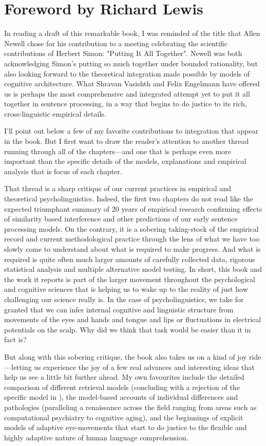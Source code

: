 \chapter*{Foreword by Richard Lewis}

In reading a draft of this remarkable book, I was reminded of the title
that Allen Newell chose for his contribution to a meeting celebrating
the scientific contributions of Herbert Simon: "Putting It All
Together".  Newell was both acknowledging Simon's putting so much
together under bounded rationality, but also looking forward to the
theoretical integration made possible by models of cognitive
architecture.  What Shravan Vasishth and Felix Engelmann have offered us
is perhaps the most comprehensive and integrated attempt yet to put it
all together in sentence processing, in a way that begins to do justice
to its rich, cross-linguistic empirical details.

I'll point out below a few of my favorite contributions to integration
that appear in the book.  But I first want to draw the reader's
attention to another thread running through all of the chapters---and
one that is perhaps even more important than the specific details of the
models, explanations and empirical analysis that is focus of each
chapter.

That thread is a sharp critique of our current practices in empirical
and theoretical psycholinguistics.  Indeed, the first two chapters do
not read like the expected triumphant summary of 20 years of empirical
research confirming effects of similarity based interference and other
predictions of our early sentence processing models. On the contrary, it
is a sobering taking-stock of the empirical record and current
methodological practice through the lens of what we have too slowly come
to understand about what is required to make progress.  And what is
required is quite often much larger amounts of carefully collected data,
rigorous statistical analysis and multiple alternative model testing. In
short, this book and the work it reports is part of the larger movement
throughout the psychological and cognitive sciences that is helping us
to wake up to the reality of just how challenging our science really is.
In the case of psycholinguistics, we take for granted that we can infer
internal cognitive and linguistic structure from movements of the eyes
and hands and tongue and lips or fluctuations in electrical potentials
on the scalp. Why did we think that task would be easier than it in fact
is?

But along with this sobering critique, the book also takes us on a kind
of joy ride---letting us experience the joy of a few real advances and
interesting ideas that help us see a little bit further ahead. My own
favourites include the detailed comparison of different retrieval models
(concluding with a rejection of the specific model in \cite{LewisVasishth2005}), the model-based accounts of individual differences and
pathologies (paralleling a renaissance across the field  ranging from
areas such as computational psychiatry to cognitive aging), and the
beginnings of explicit models of adaptive eye-movements that start to do
justice to the flexible and highly adaptive nature of human language
comprehension.

